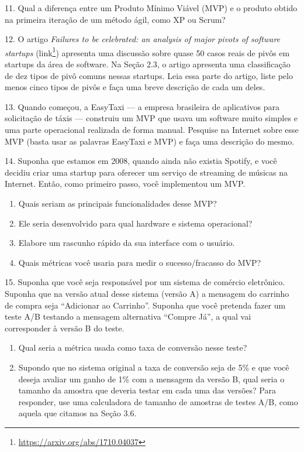\documentclass[
  11pt,
  twoside]{book}
\DeclareRobustCommand{\href}[2]{#2\footnote{\url{#1}}}
\providecommand{\tightlist}{%
  \setlength{\itemsep}{0pt}\setlength{\parskip}{0pt}}
\begin{document}
11. Qual a diferença entre um Produto Mínimo Viável (MVP) e o produto
obtido na primeira iteração de um método ágil, como XP ou Scrum?

12. O artigo \emph{Failures to be celebrated: an analysis of major
pivots of software startups}
(\href{https://arxiv.org/abs/1710.04037}{link}) apresenta uma discussão
sobre quase 50 casos reais de pivôs em startups da área de software. Na
Seção 2.3, o artigo apresenta uma classificação de dez tipos de pivô
comuns nessas startups. Leia essa parte do artigo, liste pelo menos
cinco tipos de pivôs e faça uma breve descrição de cada um deles.

13. Quando começou, a EasyTaxi --- a empresa brasileira de aplicativos
para solicitação de táxis --- construiu um MVP que usava um software
muito simples e uma parte operacional realizada de forma manual.
Pesquise na Internet sobre esse MVP (basta usar as palavras EasyTaxi e
MVP) e faça uma descrição do mesmo.

14. Suponha que estamos em 2008, quando ainda não existia Spotify, e
você decidiu criar uma startup para oferecer um serviço de streaming de
músicas na Internet. Então, como primeiro passo, você implementou um
MVP.

\begin{enumerate}
\def\labelenumi{(\alph{enumi})}
\tightlist
\item
  Quais seriam as principais funcionalidades desse MVP?
\item
  Ele seria desenvolvido para qual hardware e sistema operacional?
\item
  Elabore um rascunho rápido da sua interface com o usuário.
\item
  Quais métricas você usaria para medir o sucesso/fracasso do MVP?
\end{enumerate}

15. Suponha que você seja responsável por um sistema de comércio
eletrônico. Suponha que na versão atual desse sistema (versão A) a
mensagem do carrinho de compra seja ``Adicionar ao Carrinho''. Suponha
que você pretenda fazer um teste A/B testando a mensagem alternativa
``Compre Já'', a qual vai corresponder à versão B do teste.

\begin{enumerate}
\def\labelenumi{(\alph{enumi})}
\item
  Qual seria a métrica usada como taxa de conversão nesse teste?
\item
  Supondo que no sistema original a taxa de conversão seja de 5\% e que
  você deseja avaliar um ganho de 1\% com a mensagem da versão B, qual
  seria o tamanho da amostra que deveria testar em cada uma das versões?
  Para responder, use uma calculadora de tamanho de amostras de testes
  A/B, como aquela que citamos na Seção 3.6.
\end{enumerate}
\end{document}
